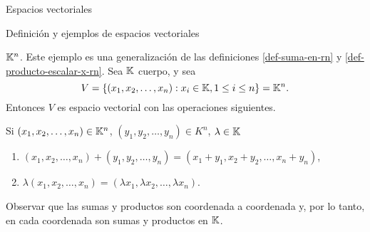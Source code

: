\begin{chapter}{Espacios vectoriales}
\begin{section}{Definici\'on y ejemplos de espacios vectoriales}
            \begin{ejemplo*} {\textsc{$\mathbb K^n$.}} Este ejemplo es una generalización de las definiciones \ref{def-suma-en-rn} y \ref{def-producto-escalar-x-rn}. Sea $\mathbb K$ cuerpo, y sea
                \begin{equation*}
                V = \{(x_1,x_2,\ldots,x_n): x_i \in \mathbb K, 1 \le i \le n \} = \mathbb K^n.
                \end{equation*}	
                Entonces $V$ es espacio vectorial con las operaciones siguientes.
                
                Si $(x_1,x_2,\ldots,x_n) \in \mathbb K^n$, $(y_1,y_2,\ldots,y_n) \in K^n$, $\lambda \in \mathbb K$
                \begin{enumerate}[label=\textit{\alph*)}, ref=\textit{\alph*)}]
                    \item $(x_1,x_2,\ldots,x_n)+ (y_1,y_2,\ldots,y_n) = (x_1+y_1,x_2+y_2,\ldots,x_n+y_n)$,
                    \item $\lambda(x_1,x_2,\ldots,x_n) = (\lambda x_1,\lambda x_2,\ldots,\lambda x_n)$.
                \end{enumerate}
                Observar que las sumas y productos son coordenada a coordenada y, por lo tanto, en cada coordenada son sumas y productos en $\mathbb K$.
                

\end{ejemplo*}
\end{section}
\end{chapter}
